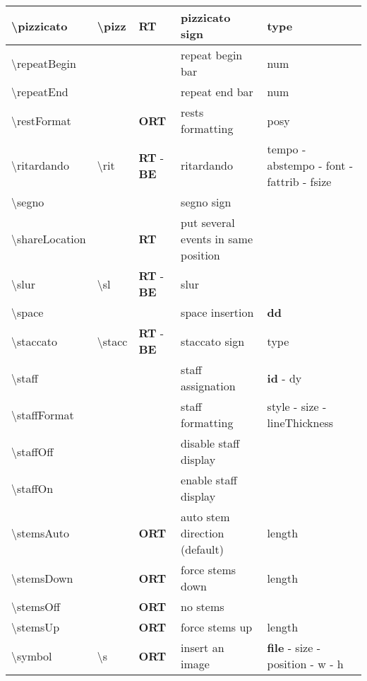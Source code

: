 \documentclass[a4paper, landscape, 10pt]{article}
\begin{document}
\begin{tabularx}{\linewidth}{p{3cm}p{4.5cm}p{3cm}p{5.5cm}l}
    \textbackslash{}pizzicato&\textbackslash{}pizz&\textbf{RT}&pizzicato sign&type\\
    \hline
    \textbackslash{}repeatBegin&&&repeat begin bar&num\\
    \hline
    \textbackslash{}repeatEnd&&&repeat end bar&num\\
    \hline
    \textbackslash{}restFormat&&\textbf{ORT}&rests formatting&posy\\
    \hline
    \textbackslash{}ritardando&\textbackslash{}rit&\textbf{RT} - \textbf{BE}&ritardando&tempo - abstempo - font - fattrib - fsize\\
    \hline
    \textbackslash{}segno&&&segno sign&\\
    \hline
    \textbackslash{}shareLocation&&\textbf{RT}&put several events in same position&\\
    \hline
    \textbackslash{}slur&\textbackslash{}sl&\textbf{RT} - \textbf{BE}&slur&\\
    \hline
    \textbackslash{}space&&&space insertion&\textbf{dd}\\
    \hline
    \textbackslash{}staccato&\textbackslash{}stacc&\textbf{RT} - \textbf{BE}&staccato sign&type\\
    \hline
    \textbackslash{}staff&&&staff assignation&\textbf{id} - dy\\
    \hline
    \textbackslash{}staffFormat&&&staff formatting&style - size - lineThickness\\
    \hline
    \textbackslash{}staffOff&&&disable staff display&\\
    \hline
    \textbackslash{}staffOn&&&enable staff display&\\
    \hline
    \textbackslash{}stemsAuto&&\textbf{ORT}&auto stem direction (default)&length\\
    \hline
    \textbackslash{}stemsDown&&\textbf{ORT}&force stems down&length\\
	\hline
    \textbackslash{}stemsOff&&\textbf{ORT}&no stems&\\
    \hline
    \textbackslash{}stemsUp&&\textbf{ORT}&force stems up&length\\
    \hline
    \textbackslash{}symbol&\textbackslash{}s&\textbf{ORT}&insert an image&\textbf{file} - size - position - w - h\\
    \hline
\end{tabularx}
%
%
\end{document}
